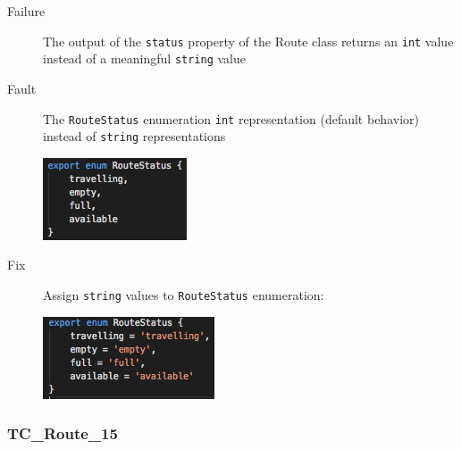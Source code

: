 \documentclass[11pt]{article}
\begin{document}
\begin{description}
\item[{Failure}] The output of the \texttt{status} property of the Route class returns an \texttt{int} value instead of a meaningful \texttt{string} value
\item[{Fault}] The \texttt{RouteStatus} enumeration \texttt{int} representation (default behavior) instead of \texttt{string} representations
\begin{center}
\includegraphics[width=.9\linewidth]{./Iteration2.rtfd/Pasted Graphic 4.tiff.png}
\end{center}
\item[{Fix}] Assign \texttt{string} values to \texttt{RouteStatus} enumeration:
\begin{center}
\includegraphics[width=.9\linewidth]{./Iteration2.rtfd/Pasted Graphic 5.tiff.png}
\end{center}
\end{description}

\subsubsection{TC\_Route\_15}
\label{sec:orgb9bb2c0}
\end{document}
